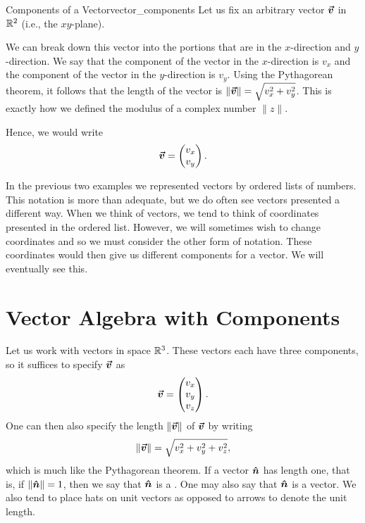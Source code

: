         \begin{ex}{Components of a Vector}{vector_components}
        Let us fix an arbitrary vector $\boldsymbol{\boldsymbol{\vec{v}}}$ in $\mathbb{R}^2$ (i.e., the $xy$-plane).  
        \begin{center}
        \end{center}
        We can break down this vector into the portions that are in the $x$-direction and $y$-direction.  We say that the component of the vector in the $x$-direction is $v_x$ and the component of the vector in the $y$-direction is $v_y$.  Using the Pythagorean theorem, it follows that the length of the vector is $\|\boldsymbol{\boldsymbol{\vec{v}}}\|=\sqrt{v_x^2+v_y^2}$. This is exactly how we defined the modulus of a complex number $\|z\|$.
        
        Hence, we would write
        \[
        \boldsymbol{\boldsymbol{\vec{v}}}=\begin{pmatrix} v_x \\ v_y \end{pmatrix}.
        \]
        \end{ex} 
        
        In the previous two examples we represented vectors by ordered lists of numbers.  This notation is more than adequate, but we do often see vectors presented a different way. When we think of vectors, we tend to think of coordinates presented in the ordered list.  However, we will sometimes wish to change coordinates and so we must consider the other form of notation. These coordinates would then give us different components for a vector.  We will eventually see this.
        
        \section{Vector Algebra with Components}
        Let us work with vectors in space $\mathbb{R}^3$.  These vectors each have three components, so it suffices to specify $\boldsymbol{\boldsymbol{\vec{v}}}$ as 
        \[
        \boldsymbol{\boldsymbol{\vec{v}}} = \begin{pmatrix} v_x \\ v_y \\ v_z \end{pmatrix}.
        \]
        One can then also specify the length $\|\boldsymbol{\boldsymbol{\vec{v}}}\|$ of $\boldsymbol{\boldsymbol{\vec{v}}}$ by writing
        \[
        \|\boldsymbol{\boldsymbol{\vec{v}}}\| = \sqrt{ v_x^2 + v_y^2 + v_z^2},
        \]
        which is much like the Pythagorean theorem. If a vector $\boldsymbol{\hat{n}}$ has length one, that is, if $\|\boldsymbol{\hat{n}}\|=1$, then we say that $\boldsymbol{\hat{n}}$ is a . One may also say that $\boldsymbol{\hat{n}}$ is a  vector. We also tend to place hats on unit vectors as opposed to arrows to denote the unit length.
        
